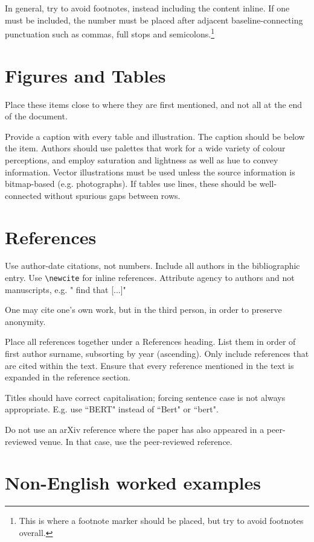\documentclass{article}
\begin{document}
In general, try to avoid footnotes, instead including the content inline. If one must be included, the number must be placed after adjacent baseline-connecting punctuation such as commas, full stops and semicolons.\footnote{This is where a footnote marker should be placed, but try to avoid footnotes overall.}

\section{Figures and Tables}

Place these items close to where they are first mentioned, and not all at the end of the document. 

Provide a caption with every table and illustration. The caption should be below the item. Authors should use palettes that work for a wide variety of colour perceptions, and employ saturation and lightness as well as hue to convey information. Vector illustrations must be used unless the source information is bitmap-based (e.g. photographs). If tables use lines, these should be well-connected without spurious gaps between rows.

\section{References}

Use author-date citations, not numbers. Include all authors in the bibliographic entry. Use {\tt {\textbackslash}newcite} for inline references. Attribute agency to authors and not manuscripts, e.g. " find that [...]"

One may cite one's own work, but in the third person, in order to preserve anonymity.

Place all references together under a References heading. List them in order of first author surname, subsorting by year (ascending). Only include references that are cited within the text. Ensure that every reference mentioned in the text is expanded in the reference section.

Titles should have correct capitalisation; forcing sentence case is not always appropriate. E.g. use ``BERT" instead of ``Bert" or ``bert".

Do not use an arXiv reference where the paper has also appeared in a peer-reviewed venue. In that case, use the peer-reviewed reference.

\section{Non-English worked examples}
\end{document}

